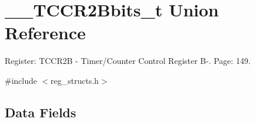 \hypertarget{union_____t_c_c_r2_bbits__t}{\section{\+\_\+\+\_\+\+T\+C\+C\+R2\+Bbits\+\_\+t Union Reference}
\label{union_____t_c_c_r2_bbits__t}
}


Register\+: T\+C\+C\+R2\+B -\/ Timer/\+Counter Control Register B-\/. Page\+: 149.  




{\ttfamily \#include $<$reg\+\_\+structs.\+h$>$}

\subsection*{Data Fields}
